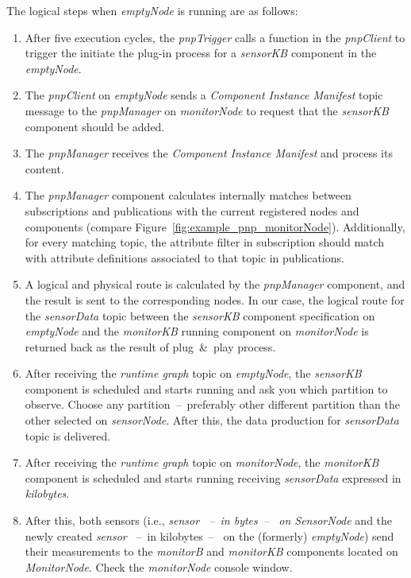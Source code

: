 The logical steps when \emph{emptyNode} is running are as follows:
\begin{enumerate}
	\item After five execution cycles, the \emph{pnpTrigger} calls a function in the \emph{pnpClient} to trigger the initiate the plug-in process for a \emph{sensorKB} component in the \emph{emptyNode}.
	\item The \emph{pnpClient} on \emph{emptyNode} sends a \emph{Component Instance Manifest} topic message to the \emph{pnpManager} on \emph{monitorNode}
		to request that the \emph{sensorKB} component should be added.
	\item The \emph{pnpManager} receives the \emph{Component Instance Manifest} and process its content.
	\item The \emph{pnpManager} component calculates internally matches between subscriptions and publications with the
		current registered nodes and components (compare Figure~\ref{fig:example_pnp_monitorNode}). Additionally, for every matching topic,
		the attribute filter in subscription should match with attribute definitions associated to that topic in publications.
	\item A logical and physical route is calculated by the \emph{pnpManager} component, and the result is sent to the corresponding nodes.
	  In our case, the logical route for the \emph{sensorData} topic between the \emph{sensorKB} component specification on \emph{emptyNode}
		and the \emph{monitorKB} running component on \emph{monitorNode} is returned back as the result of plug~\&~play process.
	\item After receiving the \emph{runtime graph} topic on \emph{emptyNode}, the \emph{sensorKB} component is scheduled and starts running and ask you which partition to observe.
		Choose any partition~--~preferably other different partition than the other selected on \emph{sensorNode}.
		After this, the data production for \emph{sensorData} topic is delivered.
	\item After receiving the \emph{runtime graph} topic on \emph{monitorNode}, the \emph{monitorKB} component is scheduled and starts running receiving \emph{sensorData} expressed in \emph{kilobytes}.
	\item After this, both sensors (i.e., \emph{sensor ~--~in bytes~--~ on \emph{SensorNode}} and the newly created \emph{sensor} ~--~in kilobytes~--~ on the (formerly) \emph{emptyNode})
		send their measurements to the \emph{monitorB} and \emph{monitorKB} components located on \emph{MonitorNode}.
		Check the \emph{monitorNode} console window.
\end{enumerate}

